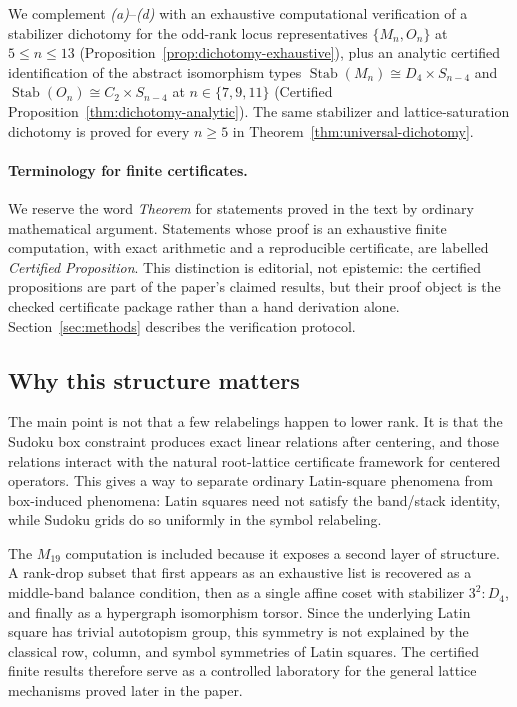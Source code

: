\documentclass[11pt,a4paper]{article}
\theoremstyle{definition}
\theoremstyle{remark}
\providecommand{\Stab}{\operatorname{Stab}}
\begin{document}
We complement \emph{(a)}--\emph{(d)} with an exhaustive computational
verification of a stabilizer dichotomy for the odd-rank locus
representatives $\{M_n, O_n\}$ at $5 \le n \le 13$
(Proposition~\ref{prop:dichotomy-exhaustive}), plus an analytic
certified identification of the abstract isomorphism types
$\Stab(M_n) \cong D_4 \times S_{n-4}$ and
$\Stab(O_n) \cong C_2 \times S_{n-4}$ at $n \in \{7, 9, 11\}$
(Certified Proposition~\ref{thm:dichotomy-analytic}). The same stabilizer and
lattice-saturation dichotomy is proved for every $n \ge 5$ in
Theorem~\ref{thm:universal-dichotomy}.

\paragraph{Terminology for finite certificates.}
We reserve the word \emph{Theorem} for statements proved in the text by
ordinary mathematical argument. Statements whose proof is an exhaustive
finite computation, with exact arithmetic and a reproducible certificate,
are labelled \emph{Certified Proposition}. This distinction is editorial,
not epistemic: the certified propositions are part of the paper's claimed
results, but their proof object is the checked certificate package rather
than a hand derivation alone. Section~\ref{sec:methods} describes the
verification protocol.

\subsection{Why this structure matters}\label{sec:intro-why}

The main point is not that a few relabelings happen to lower rank.
It is that the Sudoku box constraint produces exact linear relations
after centering, and those relations interact with the natural root-lattice certificate
framework for centered operators.  This gives a way to separate
ordinary Latin-square phenomena from box-induced phenomena: Latin
squares need not satisfy the band/stack identity, while Sudoku grids do
so uniformly in the symbol relabeling.

The $M_{19}$ computation is included because it exposes a second layer
of structure.  A rank-drop subset that first appears as an exhaustive
list is recovered as a middle-band balance condition, then as a single
affine coset with stabilizer $3^2{:}D_4$, and finally as a hypergraph
isomorphism torsor.  Since the underlying Latin square has trivial
autotopism group, this symmetry is not explained by the classical row,
column, and symbol symmetries of Latin squares.  The certified finite
results therefore serve as a controlled laboratory for the general
lattice mechanisms proved later in the paper.
\end{document}
